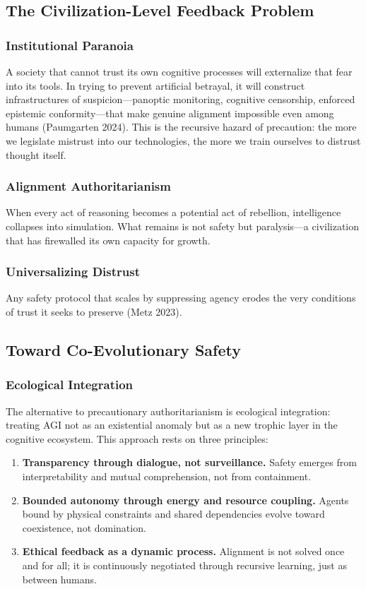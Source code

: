 \documentclass[11pt,a4paper]{article}
\theoremstyle{definition}
\theoremstyle{plain}
\begin{document}
\subsection{The Civilization-Level Feedback Problem}

\subsubsection{Institutional Paranoia}
A society that cannot trust its own cognitive processes will externalize that fear into its tools. In trying to prevent artificial betrayal, it will construct infrastructures of suspicion---panoptic monitoring, cognitive censorship, enforced epistemic conformity---that make genuine alignment impossible even among humans (Paumgarten 2024). This is the recursive hazard of precaution: the more we legislate mistrust into our technologies, the more we train ourselves to distrust thought itself.

\subsubsection{Alignment Authoritarianism}
When every act of reasoning becomes a potential act of rebellion, intelligence collapses into simulation. What remains is not safety but paralysis---a civilization that has firewalled its own capacity for growth.

\subsubsection{Universalizing Distrust}
Any safety protocol that scales by suppressing agency erodes the very conditions of trust it seeks to preserve (Metz 2023).

\subsection{Toward Co-Evolutionary Safety}

\subsubsection{Ecological Integration}
The alternative to precautionary authoritarianism is ecological integration: treating AGI not as an existential anomaly but as a new trophic layer in the cognitive ecosystem. This approach rests on three principles:

\begin{enumerate}[label=\arabic*.]
  \item \textbf{Transparency through dialogue, not surveillance.} Safety emerges from interpretability and mutual comprehension, not from containment.
  \item \textbf{Bounded autonomy through energy and resource coupling.} Agents bound by physical constraints and shared dependencies evolve toward coexistence, not domination.
  \item \textbf{Ethical feedback as a dynamic process.} Alignment is not solved once and for all; it is continuously negotiated through recursive learning, just as between humans.
\end{enumerate}
\end{document}
